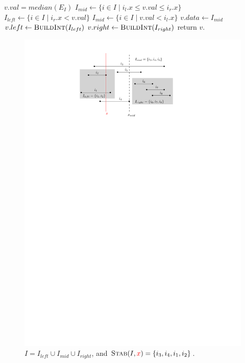 \begin{algorithm}[H]
    \caption{} 
    \label{alg:build-interval}
    \begin{algorithmic}[1]
        	\State $v.val = median(E_I)$ 
          	\State $I_{mid} \leftarrow \{ i \in I \mid i_l.x \leq v.val \leq i_r.x  \}$
          	\State $I_{left} \leftarrow \{ i \in I \mid  i_r.x < v.val \}$
          	\State $I_{mid} \leftarrow \{ i \in I \mid  v.val < i_l.x  \}$
          	\State $v.data \leftarrow I_{mid}$ 
          	\State $v.left \leftarrow \textsc{BuildInt} (I_{left})$
          	\State $v.right \leftarrow \textsc{BuildInt} (I_{right})$ 	 
          \State return $v$.
        \EndFunction
    \end{algorithmic}
\end{algorithm}

\begin{figure}[ht!]
\centering
\includegraphics[scale=.8]{ipe/stabbing-line.pdf}
\caption{ $I = I_{left} \cup I_{mid} \cup I_{right} $, and $\textsc{Stab}(I, \textcolor{red}{x}) = \{ i_3, i_4, i_1, i_2 \}$.}
\label{fig:stabbing-line}
\end{figure}

